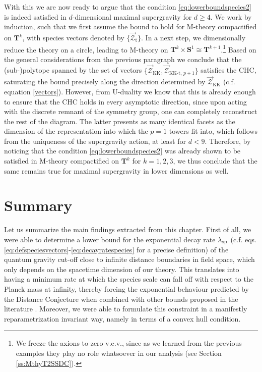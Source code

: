 With this we are now ready to argue that the condition \eqref{eq:lowerboundspecies2} is indeed satisfied in $d$-dimensional maximal supergravity for $d\geq4$. We work by induction, such that we first assume the bound to hold for M-theory compactified on $\mathbf{T}^k$, with species vectors denoted by $\{\vec{\mathcal{Z}}_{\text{t}}\}$. In a next step, we dimensionally reduce the theory on a circle, leading to M-theory on $\mathbf{T}^k \times \mathbf{S}^1 \cong \mathbf{T}^{k+1}$.\footnote{We freeze the axions to zero v.e.v., since as we learned from the previous examples they play no role whatsoever in our analysis (see Section \ref{ss:MthyT2SSDC}).} Based on the general considerations from the previous paragraph we conclude that the (sub-)polytope spanned by the set of vectors $\lbrace \vec{\mathcal{Z}}_{\text{KK}}, \vec{\mathcal{Z}}_{\text{KK-t},\, p+1}\rbrace$ satisfies the CHC, saturating the bound precisely along the direction determined by $\vec{\mathcal{Z}}_{\text{KK}}$ (c.f. equation \eqref{vectors}). However, from U-duality we know that this is already enough to ensure that the CHC holds in every asymptotic direction, since upon acting with the discrete remnant of the symmetry group, one can completely reconstruct the rest of the diagram. The latter presents as many identical facets as the dimension of the representation into which the $p=1$ towers fit into, which follows from the uniqueness of the supergravity action, at least for $d<9$. Therefore, by noticing that the condition \eqref{eq:lowerboundspecies2} was already shown to be satisfied in M-theory compactified on $\mathbf{T}^k$ for $k=1,2,3$, we thus conclude that the same remains true for maximal supergravity in lower dimensions as well.

\section{Summary}\label{s:summarybounds}

Let us summarize the main findings extracted from this chapter. First of all, we were able to determine a lower bound for the exponential decay rate $\lambda_{\rm sp}$ (c.f. eqs. \eqref{eq:defspeciesvectors}-\eqref{eq:decayratespecies} for a precise definition) of the quantum gravity cut-off close to infinite distance boundaries in field space, which only depends on the spacetime dimension of our theory. This translates into having a minimum rate at which the species scale can fall off with respect to the Planck mass at infinity, thereby forcing the exponential behaviour predicted by the Distance Conjecture \cite{Ooguri:2006in} when combined with other bounds proposed in the literature \cite{vandeHeisteeg:2023ubh, Calderon-Infante:2023ler}. Moreover, we were able to formulate this constraint in a manifestly reparametrization invariant way, namely in terms of a convex hull condition.

